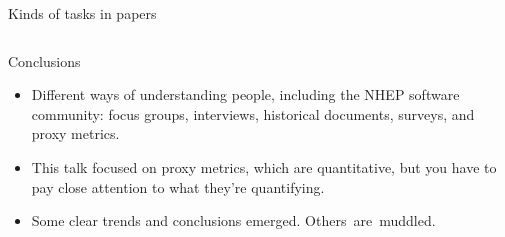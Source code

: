 \documentclass[aspectratio=169]{beamer}
\begin{document}
\begin{frame}{Kinds of tasks in  papers}
\begin{columns}
\end{columns}
\end{frame}

\begin{frame}{Conclusions}
\Large
\vspace{0.5 cm}
\begin{itemize}\setlength{\itemsep}{0.5 cm}
\item Different ways of understanding people, including the NHEP software community: focus groups, interviews, historical documents, surveys, and proxy metrics.

\item This talk focused on proxy metrics, which are quantitative, but you have to pay close attention to what they're quantifying.

\item Some clear trends and conclusions emerged. \mbox{Others are muddled.\hspace{-1 cm}}
\end{itemize}
\end{frame}
\end{document}
